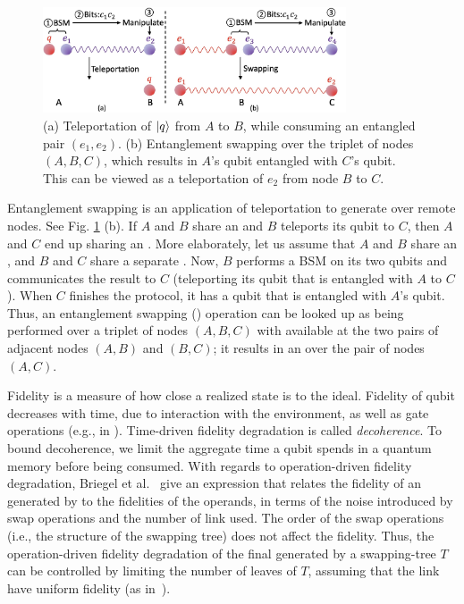 \begin{figure}
    \centering
    \includegraphics[width=0.8\textwidth]{chapters/swappingtrees/figures/teleportation_swapping.jpg}
    \caption{(a)  Teleportation of $\ket{q}$ from $A$ to $B$, while consuming an entangled pair $(e_1, e_2)$. (b) Entanglement swapping over the triplet of nodes $(A, B, C)$, which results in $A$'s qubit entangled with $C$'s qubit. This can be viewed as a teleportation of $e_2$ from node $B$ to $C$.}
  \label{fig:swapping_teleport_swap}
\end{figure}

Entanglement swapping is an application of teleportation 
to generate \epss over remote nodes. See Fig. \ref{fig:swapping_teleport_swap} (b).
If $A$ and $B$ share an \eps  and $B$ teleports its qubit to $C$, then 
 $A$ and $C$ end up sharing an \eps. 
More elaborately, let us assume that $A$ and $B$
share an \eps, and $B$ and $C$ share a separate \eps. 
Now, $B$ performs a  BSM 
on its two qubits and communicates the result to $C$ (teleporting its 
 qubit that is entangled with $A$ to $C$). When $C$ finishes the protocol, it has a qubit
that is entangled with $A$'s qubit. Thus, an entanglement swapping (\es)
 operation can be looked up as being performed over a triplet of nodes $(A, B, C)$ 
with \eps available 
at the 
two pairs of adjacent nodes $(A, B)$ and $(B,C)$; it results in an \eps over the pair
of nodes $(A, C)$. 

Fidelity is a measure of how close a realized state is to the ideal. 
Fidelity of qubit decreases with time, due to interaction with the environment,
as well as gate operations (e.g., in \es). 
Time-driven fidelity degradation is called \emph{decoherence}. 
To bound decoherence, we limit the aggregate time a qubit spends in a 
quantum memory before being consumed.
With regards to operation-driven fidelity degradation, 
Briegel et al.~\cite{BreigelEtAl1998} give an expression 
that relates the fidelity of an \eps generated by \es 
to the fidelities of the operands,  in terms of the 
noise introduced by swap operations and the number of link \epss used. The order of the swap operations (i.e., the structure of the 
swapping tree) does not affect the fidelity. 
Thus, the operation-driven fidelity degradation of the final \eps 
generated by a swapping-tree $T$
can be controlled by limiting the number of leaves of $T$, assuming that
the link \epss have uniform fidelity (as in~\cite{delft-lp}).


